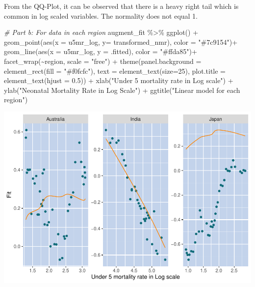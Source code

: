 \documentclass[
]{article}
\newenvironment{Shaded}{\begin{snugshade}}{\end{snugshade}}
\newcommand{\AttributeTok}[1]{\textcolor[rgb]{0.77,0.63,0.00}{#1}}
\newcommand{\CommentTok}[1]{\textcolor[rgb]{0.56,0.35,0.01}{\textit{#1}}}
\newcommand{\DecValTok}[1]{\textcolor[rgb]{0.00,0.00,0.81}{#1}}
\newcommand{\FloatTok}[1]{\textcolor[rgb]{0.00,0.00,0.81}{#1}}
\newcommand{\FunctionTok}[1]{\textcolor[rgb]{0.00,0.00,0.00}{#1}}
\newcommand{\NormalTok}[1]{#1}
\newcommand{\SpecialCharTok}[1]{\textcolor[rgb]{0.00,0.00,0.00}{#1}}
\newcommand{\StringTok}[1]{\textcolor[rgb]{0.31,0.60,0.02}{#1}}
\begin{document}
From the QQ-Plot, it can be observed that there is a heavy right tail
which is common in log scaled variables. The normality does not equal 1.

\begin{Shaded}
\begin{Highlighting}[]
\CommentTok{\# Part b: For data in each region}
\NormalTok{augment\_fit }\SpecialCharTok{\%\textgreater{}\%} 
  \FunctionTok{ggplot}\NormalTok{() }\SpecialCharTok{+}
  \FunctionTok{geom\_point}\NormalTok{(}\FunctionTok{aes}\NormalTok{(}\AttributeTok{x =}\NormalTok{ u5mr\_log, }\AttributeTok{y=}\NormalTok{ transformed\_nmr), }\AttributeTok{color =} \StringTok{"\#7c9154"}\NormalTok{)}\SpecialCharTok{+}
  \FunctionTok{geom\_line}\NormalTok{(}\FunctionTok{aes}\NormalTok{(}\AttributeTok{x =}\NormalTok{ u5mr\_log, }\AttributeTok{y =}\NormalTok{ .fitted), }\AttributeTok{color =} \StringTok{"\#ffda85"}\NormalTok{)}\SpecialCharTok{+}
  \FunctionTok{facet\_wrap}\NormalTok{(}\SpecialCharTok{\textasciitilde{}}\NormalTok{region, }\AttributeTok{scale =} \StringTok{"free"}\NormalTok{) }\SpecialCharTok{+}
  \FunctionTok{theme}\NormalTok{(}\AttributeTok{panel.background =} \FunctionTok{element\_rect}\NormalTok{(}\AttributeTok{fill =} \StringTok{"\#f0fcfc"}\NormalTok{), }\AttributeTok{text =} \FunctionTok{element\_text}\NormalTok{(}\AttributeTok{size=}\DecValTok{25}\NormalTok{),}
        \AttributeTok{plot.title =} \FunctionTok{element\_text}\NormalTok{(}\AttributeTok{hjust =} \FloatTok{0.5}\NormalTok{)) }\SpecialCharTok{+}
  \FunctionTok{xlab}\NormalTok{(}\StringTok{"Under 5 mortality rate in Log scale"}\NormalTok{) }\SpecialCharTok{+}
  \FunctionTok{ylab}\NormalTok{(}\StringTok{"Neonatal Mortality Rate in Log Scale"}\NormalTok{) }\SpecialCharTok{+}
  \FunctionTok{ggtitle}\NormalTok{(}\StringTok{"Linear model for each region"}\NormalTok{)}
\end{Highlighting}
\end{Shaded}

\includegraphics{A2_files/figure-latex/unnamed-chunk-6-1.pdf}
\end{document}
